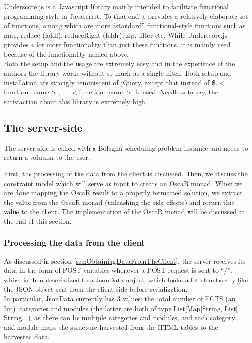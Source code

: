 \documentclass[a4paper]{article}
\begin{document}
Underscore.js is a Javascript library mainly intended to facilitate
functional programming style in Javascript. To that end it provides a
relatively elaborate set of functions, among which are more
``standard'' functional-style functions such as map, reduce (foldl),
reduceRight (foldr), zip, filter etc. While Underscore.js provides a
lot more functionality than just these functions, it is mainly used
because of the functionality named above.\\

Both the setup and the usage are extremely easy and in the experience
of the authors the library works without so much as a single
hitch. Both setup and installation are strongly reminiscent of jQuery,
except that instead of \textbf{\$}.$<$function\_name$>$,
\textbf{\_}.$<$function\_name$>$ is used. Needless to say, the
satisfaction about this library is extremely high.\\

\subsection{The server-side}
The server-side is called with a Bologna scheduling problem instance
and needs to return a solution to the user.

First, the processing of the data from the client is discussed.
Then, we discuss the constraint model which will serve as input to create
an OscaR monad.
When we are done mapping the OscaR result to a properly formatted solution,
we extract the value from the OscaR monad (unleashing the side-effects)
and return this value to the client.
The implementation of the OscaR monad will be discussed at the end of this section.
\subsubsection{Processing the data from the client}
\label{sec:ProcessingTheDataFromTheClient}

As discussed in section \ref{sec:ObtainingDataFromTheClient}, the
server receives its data in the form of POST variables whenever a POST
request is sent to ``/'', which is then deserialized to a JsonData
object, which looks a lot structurally like the JSON object sent from
the client side before serialization.\\

In particular, JsonData currently has 3 values: the total number of
ECTS (an Int), categories and modules (the latter are both of type
List$[$Map$[$String, List$[$String$]]]$), as there can be multiple
categories and modules, and each category and module maps the
structure harvested from the HTML tables to the harvested data.
\end{document}
